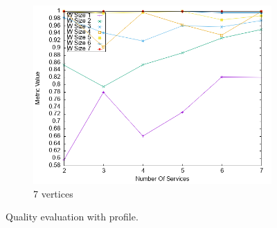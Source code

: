 \begin{figure}[!htb]
\begin{subfigure}{0.33\textwidth}
    \includegraphics[width=\textwidth]{Images/graphs/newwindow_quality_performance_diff_perce_n7_s7_20_100_n7}
    \caption{7 vertices}
    \label{fig:quality_window_perce_wide_7n}
  \end{subfigure}
  \caption{ Quality evaluation with \wide profile.}
  \label{fig:quality_window_perce_wide}
\end{figure}


